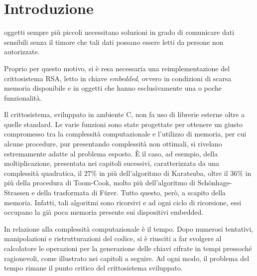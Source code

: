 \chapter{Introduzione}

 oggetti sempre più piccoli necessitano soluzioni in grado di comunicare dati sensibili senza il timore che tali dati possano essere letti da persone non autorizzate.

Proprio per questo motivo, si è resa necessaria una reimplementazione del crittosistema RSA, letto in chiave \emph{embedded}, ovvero in condizioni di scarsa memoria disponibile e in oggetti che hanno esclusivamente una o poche funzionalità.

Il crittosistema, sviluppato in ambiente C, non fa uso di librerie esterne oltre a quelle standard. Le varie funzioni sono state progettate per ottenere un giusto compromesso tra la complessità computazionale e l'utilizzo di memoria, per cui alcune procedure, pur presentando complessità non ottimali, si rivelano estremamente adatte al problema esposto. È il caso, ad esempio, della moltiplicazione, presentata nei capitoli sucessivi, caratterizzata da una complessità quadratica, il $27\%$ in più dell'algoritmo di Karatsuba, oltre il $36\%$ in più della procedura di Toom-Cook, molto più dell'algoritmo di Sch\"onhage-Strassen e della trasformata di F\"urer. Tutto questo, però, a scapito della memoria. Infatti, tali algoritmi sono ricorsivi e ad ogni ciclo di ricorsione, essi occupano la già poca memoria presente sui dispositivi embedded.

In relazione alla complessità computazionale è il tempo. Dopo numerosi tentativi, manipolazioni e ristrutturazioni del codice, si è riusciti a far svolgere al calcolatore le operazioni per la generazione delle chiavi cifrate in tempi pressoché ragionevoli, come illustrato nei capitoli a seguire. Ad ogni modo, il problema del tempo rimane il punto critico del crittosistema sviluppato.

